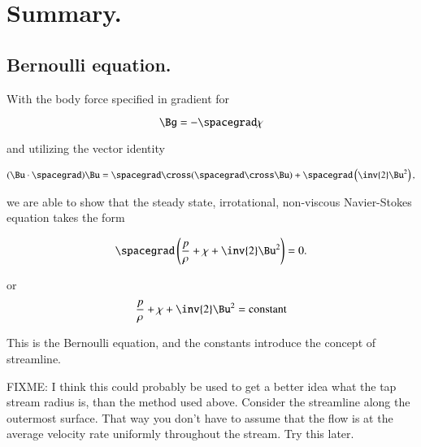 \section{Summary.}
\subsection{Bernoulli equation.}

With the body force specified in gradient for

\begin{equation}\label{eqn:continuumFluidsReview:2290}
\Bg = - \spacegrad \chi
\end{equation}

and utilizing the vector identity

\begin{equation}\label{eqn:continuumFluidsReview:2310}
(\Bu \cdot \spacegrad) \Bu = \spacegrad \cross (\spacegrad \cross \Bu) + \spacegrad \left( \inv{2} \Bu^2 \right),
\end{equation}

we are able to show that the steady state, irrotational, non-viscous Navier-Stokes equation takes the form

\begin{equation}\label{eqn:continuumFluidsReview:2330}
\spacegrad \left( \frac{p}{\rho} + \chi + \inv{2} \Bu^2 \right) = 0.
\end{equation}

or
\begin{equation}\label{eqn:continuumFluidsReview:2350}
\frac{p}{\rho} + \chi + \inv{2} \Bu^2 = \text{constant}
\end{equation}

This is the Bernoulli equation, and the constants introduce the concept of streamline.  

FIXME: I think this could probably be used to get a better idea what the tap stream radius is, than the method used above.  Consider the streamline along the outermost surface.  That way you don't have to assume that the flow is at the average velocity rate uniformly throughout the stream.  Try this later.

